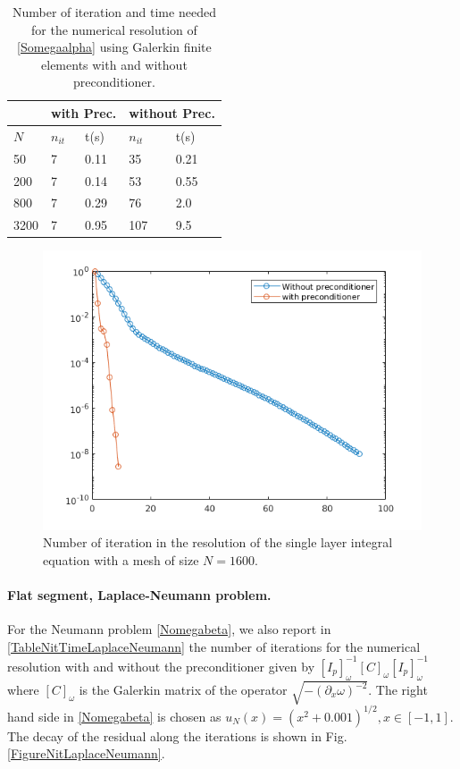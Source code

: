 \documentclass[a4paper]{subfiles}
\begin{document}
\begin{table}[H]
	\begin{center}
		\begin{tabular}{m{4em}|m{4em}|m{4em}|m{4em}| m{4em}} 
			\hline
			\multicolumn{1}{c|}{ }&
			\multicolumn{2}{c|}{with Prec.}&\multicolumn{2}{c}{without Prec.}\\
			\hline
			$N$ & $n_{it}$& t(s) & $n_{it}$ & t(s)\\
			\hline\hline
			50 & 7 & 0.11 & 35 & 0.21\\
			\hline
			200 & 7 & 0.14 & 53 & 0.55\\
			\hline
			800 & 7 & 0.29 & 76 & 2.0 \\
			\hline
			3200 & 7 & 0.95 & 107 & 9.5\\
			\hline
		\end{tabular}
		\caption{Number of iteration and time needed for the numerical resolution of \eqref{Somegaalpha} using Galerkin finite elements with and without preconditioner.}
		\label{TableNitTimeLaplaceDirichlet}
	\end{center}
\end{table}
\begin{figure}[H]
	\centering
	\includegraphics[scale=0.7]{OpenArc/figs/PrecondDirichletLaplaceSeg.png}
	\caption{Number of iteration in the resolution of the single layer integral equation with a mesh of size $N = 1600$.}
	\label{FigureNitLaplaceDirichlet}
\end{figure}

\paragraph{Flat segment, Laplace-Neumann problem.} 
For the Neumann problem \eqref{Nomegabeta}, we also report in \autoref{TableNitTimeLaplaceNeumann} the number of iterations for the 
numerical resolution with and without the preconditioner given by $[I_p]^{-1}_{\omega} \left[C \right]_\omega [I_p]^{-1}_{\omega}$ where $\left[ C \right]_\omega$ 
is the Galerkin matrix of the operator $\sqrt{ -( \partial_x \omega)^{-2}}$. The right hand side in \eqref{Nomegabeta} is chosen as 
$u_N(x) = (x^2 + 0.001)^{1/2}, x \in [-1,1]$. The decay of the residual along the iterations is shown in Fig. \ref{FigureNitLaplaceNeumann}.
\end{document}
